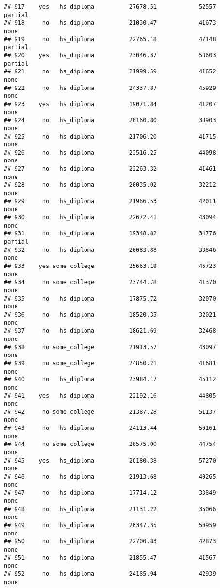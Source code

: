 \documentclass[
]{article}
\begin{document}
\begin{verbatim}
## 917    yes   hs_diploma          27678.51            52557     partial
## 918     no   hs_diploma          21030.47            41673        none
## 919     no   hs_diploma          22765.18            47148     partial
## 920    yes   hs_diploma          23046.37            58603     partial
## 921     no   hs_diploma          21999.59            41652        none
## 922     no   hs_diploma          24337.87            45929        none
## 923    yes   hs_diploma          19071.84            41207        none
## 924     no   hs_diploma          20160.80            38903        none
## 925     no   hs_diploma          21706.20            41715        none
## 926     no   hs_diploma          23516.25            44098        none
## 927     no   hs_diploma          22263.32            41461        none
## 928     no   hs_diploma          20035.02            32212        none
## 929     no   hs_diploma          21966.53            42011        none
## 930     no   hs_diploma          22672.41            43094        none
## 931     no   hs_diploma          19348.82            34776     partial
## 932     no   hs_diploma          20083.88            33846        none
## 933    yes some_college          25663.18            46723        none
## 934     no some_college          23744.78            41370        none
## 935     no   hs_diploma          17875.72            32070        none
## 936     no   hs_diploma          18520.35            32021        none
## 937     no   hs_diploma          18621.69            32468        none
## 938     no some_college          21913.57            43097        none
## 939     no some_college          24850.21            41681        none
## 940     no   hs_diploma          23984.17            45112        none
## 941    yes   hs_diploma          22192.16            44805        none
## 942     no some_college          21387.28            51137        none
## 943     no   hs_diploma          24113.44            50161        none
## 944     no some_college          20575.00            44754        none
## 945    yes   hs_diploma          26180.38            57270        none
## 946     no   hs_diploma          21913.68            40265        none
## 947     no   hs_diploma          17714.12            33849        none
## 948     no   hs_diploma          21131.22            35066        none
## 949     no   hs_diploma          26347.35            50959        none
## 950     no   hs_diploma          22700.83            42873        none
## 951     no   hs_diploma          21855.47            41567        none
## 952     no   hs_diploma          24185.94            42939        none

\end{verbatim}
\end{document}
